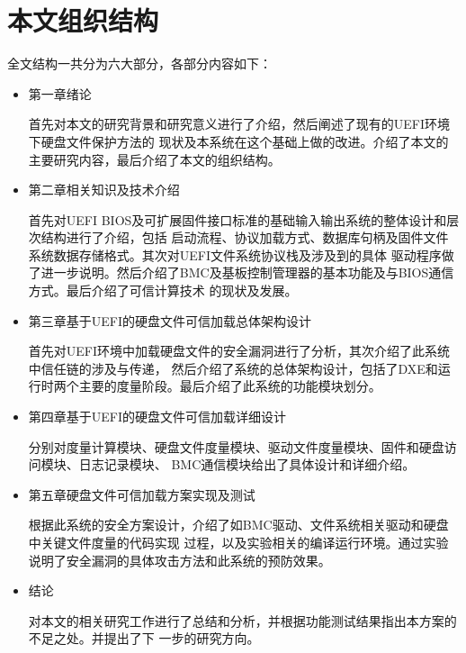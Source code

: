\section{本文组织结构}
全文结构一共分为六大部分，各部分内容如下：
\begin{itemize}
\item 第一章\quad 绪论
\par 首先对本文的研究背景和研究意义进行了介绍，然后阐述了现有的UEFI环境下硬盘文件保护方法的
现状及本系统在这个基础上做的改进。介绍了本文的主要研究内容，最后介绍了本文的组织结构。
\item 第二章\quad 相关知识及技术介绍
\par 首先对UEFI BIOS及可扩展固件接口标准的基础输入输出系统的整体设计和层次结构进行了介绍，包括
启动流程、协议加载方式、数据库句柄及固件文件系统数据存储格式。其次对UEFI文件系统协议栈及涉及到的具体
驱动程序做了进一步说明。然后介绍了BMC及基板控制管理器的基本功能及与BIOS通信方式。最后介绍了可信计算技术
的现状及发展。
\item 第三章\quad 基于UEFI的硬盘文件可信加载总体架构设计
\par 首先对UEFI环境中加载硬盘文件的安全漏洞进行了分析，其次介绍了此系统中信任链的涉及与传递，
然后介绍了系统的总体架构设计，包括了DXE和运行时两个主要的度量阶段。最后介绍了此系统的功能模块划分。
\item 第四章\quad 基于UEFI的硬盘文件可信加载详细设计
\par 分别对度量计算模块、硬盘文件度量模块、驱动文件度量模块、固件和硬盘访问模块、日志记录模块、
BMC通信模块给出了具体设计和详细介绍。
\item 第五章\quad 硬盘文件可信加载方案实现及测试
\par 根据此系统的安全方案设计，介绍了如BMC驱动、文件系统相关驱动和硬盘中关键文件度量的代码实现
过程，以及实验相关的编译运行环境。通过实验说明了安全漏洞的具体攻击方法和此系统的预防效果。
\item 结论
\par 对本文的相关研究工作进行了总结和分析，并根据功能测试结果指出本方案的不足之处。并提出了下
一步的研究方向。
\end{itemize}
